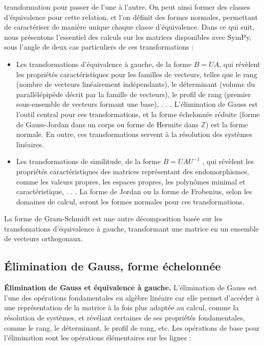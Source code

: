 transformation pour passer de l’une à l’autre. On peut ainsi former des classes
d’équivalence pour cette relation, et l’on définit des formes normales, permettant
de caractériser de manière unique chaque classe d’équivalence. Dans ce qui suit,
nous présentons l’essentiel des calculs sur les matrices disponibles avec SymPy, sous
l’angle de deux cas particuliers de ces transformations :

\begin{itemize}
 	 \item Les transformations d’équivalence à gauche, de la forme $B = UA$, qui
révèlent les propriétés caractéristiques pour les familles de vecteurs, telles
que le rang (nombre de vecteurs linéairement indépendants), le déterminant
(volume du parallélépipède décrit par la famille de vecteurs), le profil de rang
(premier sous-ensemble de vecteurs formant une base), . . . L’élimination de
Gauss est l’outil central pour ces transformations, et la forme échelonnée
réduite (forme de Gauss-Jordan dans un corps ou forme de Hermite dans $\mathbb{Z}$)
est la forme normale. En outre, ces transformations servent à la résolution
des systèmes linéaires.
	 \item  Les transformations de similitude, de la forme $B = UAU^{-1}$ , qui révèlent les
propriétés caractéristiques des matrices représentant des endomorphismes,
comme les valeurs propres, les espaces propres, les polynômes minimal et
caractéristique, . . . La forme de Jordan ou la forme de Frobenius, selon les
domaines de calcul, seront les formes normales pour ces transformations.

\end{itemize}

La forme de Gram-Schmidt est une autre décomposition basée sur les transfomations d’équivalence à gauche, transformant une matrice en un ensemble de vecteurs orthogonaux.

\subsection{ Élimination de Gauss, forme échelonnée}
\textbf{Élimination de Gauss et équivalence à gauche.} L’élimination de Gauss est l’une des opérations fondamentales en algèbre linéaire car elle permet d’accéder à une représentation de la matrice à la fois plus adaptée au calcul, comme la résolution de systèmes, et révélant certaines de ses propriétés fondamentales,
comme le rang, le déterminant, le profil de rang, etc. Les opérations de base pour l’élimination sont les opérations élémentaires sur les lignes :


